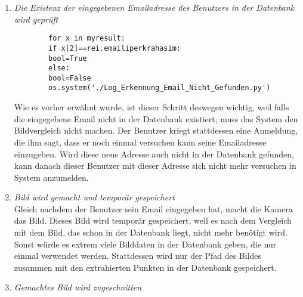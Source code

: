 \begin{enumerate}
Es ist wichtig zu erw{\"a}hnen, es dass für die Umsetzung dieses Systems notwendig ist, die verschiedenen Skripten miteinander zu verbinden.  Deshalb müssen sie innerhalb anderer Skripten angerufen werden. Das wird durch Variablen gemacht. Deshalb ist das Importieren des Pakets sys n{\"o}tig. Der Benutzer gibt seine Emailadresse an, die danach verwendet wird, um in der Datenbank schneller auf die Benutzerbilddaten zuzugreifen. Es wurde deshalb die Emailadresse(und nicht Vorname, Nachname usw.) gewählt, weil diese Adresse immer eindeutig ist, das heißt, es ist unmöglich, dass zwei Benutzern dieselbe Adresse haben, und dasselbe kann für die andere Benutzerdaten(Vorname, Nachname usw.) nicht gesagt werden.
\item \textit{Die Existenz der eingegebenen Emailadresse des Benutzers in der Datenbank wird geprüft} \\
	\begin{lstlisting}
		for x in myresult:
		if x[2]==rei.emailiperkrahasim:
		bool=True
		else:
		bool=False
		os.system('./Log_Erkennung_Email_Nicht_Gefunden.py')
	\end{lstlisting}
Wie es vorher erwähnt wurde, ist dieser Schritt deswegen wichtig, weil falls die eingegebene Email nicht in der Datenbank existiert, muss das System den Bildvergleich nicht machen. Der Benutzer kriegt stattdessen eine Anmeldung, die ihm sagt, dass er noch einmal versuchen kann seine Emailadresse einzugeben. Wird diese neue Adresse auch nicht in der Datenbank gefunden, kann danach dieser Benutzer mit dieser Adresse sich nicht mehr versuchen in System anzumelden. 
\item \textit{Bild wird gemacht und tempor{\"a}r gespeichert} \\

Gleich nachdem der Benutzer sein Email eingegeben hat, macht die Kamera das Bild. Dieses Bild wird tempor{\"a}r gespeichert, weil es nach dem Vergleich mit dem Bild, das schon in der Datenbank liegt, nicht mehr benötigt wird. Sonst w{\"u}rde es extrem viele Bilddaten in der Datenbank geben, die nur einmal verwendet werden. Stattdessen wird nur der Pfad des Bildes zusammen mit den extrahierten Punkten in der Datenbank gespeichert.
	\item \textit{Gemachtes Bild wird zugeschnitten} \\
	

\end{enumerate}
